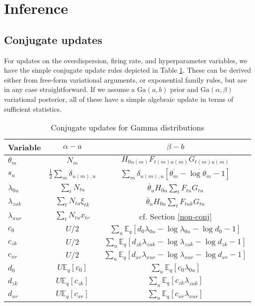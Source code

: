\documentclass{article} %
\begin{document}
\section{Inference}
\subsection{Conjugate updates}
For updates on the overdispersion, firing rate, and hyperparameter variables, we have the simple conjugate update rules depicted in Table \ref{conj_updates}. These can be derived either from free-form variational arguments, or exponential family rules, but are in any case straightforward\cite{Blei2006-oh}. If we assume a $\text{Ga}(a, b)$ prior and $\text{Ga}(\alpha, \beta)$ variational posterior, all of these have a simple algebraic update in terms of sufficient statistics.

\begin{table}[ht]
\caption{Conjugate updates for Gamma distributions}
\label{conj_updates}
\begin{center}
\begin{tabular}{lcc}
\multicolumn{1}{c}{\bf Variable}  &\multicolumn{1}{c}{\bf $\alpha - a$} &\multicolumn{1}{c}{\bf $\beta - b$}
\\ \hline
$\theta_m$         &$N_m$  &$H_{0u(m)}F_{t(m)u(m)}G_{t(m)u(m)}$ \\
$s_u$         &$\frac{1}{2}\sum_m \delta_{u(m), u}$  &$\sum_m \delta_{u(m), u} [\overline{\theta_m} - \overline{\log \theta_m} - 1]$ \\
$\lambda_{0u}$         &$\sum_{t} N_{tu}$  &$\overline{\theta}_u H_{0u}\sum_t F_{tu}G_{tu}$ \\
$\lambda_{zuk}$         &$\sum_t N_{tu} \xi_{tk}$  &$\overline{\theta}_u H_{0u}\sum_t F_{tuk}G_{tu}$ \\
$\lambda_{xur}$         &$\sum_t N_{tu} x_{tr}$  &cf. Section \ref{non-conj} \\
$c_{0}$         &$U/2$  &$\sum_u\mathbb{E}_q \left[d_{0} \lambda_{0u} - \log \lambda_{0u} - \log d_{0} - 1\right]$ \\
$c_{zk}$         &$U/2$  &$\sum_u\mathbb{E}_q \left[d_{zk} \lambda_{zuk} - \log \lambda_{zuk} - \log d_{zk} - 1\right]$ \\
$c_{xr}$         &$U/2$  &$\sum_u\mathbb{E}_q \left[d_{xr} \lambda_{xur} - \log \lambda_{xur} - \log d_{xr} - 1\right]$ \\
$d_{0}$         &$U\mathbb{E}_q[c_{0}]$  &$\sum_u\mathbb{E}_q \left[c_{0}\lambda_{0u}\right]$ \\
$d_{zk}$         &$U\mathbb{E}_q[c_{zk}]$  &$\sum_u\mathbb{E}_q \left[c_{zk}\lambda_{zuk}\right]$ \\
$d_{xr}$         &$U\mathbb{E}_q[c_{xr}]$  &$\sum_u\mathbb{E}_q \left[c_{xr}\lambda_{xur}\right]$ \\
\end{tabular}
\end{center}
\end{table}
\end{document}
